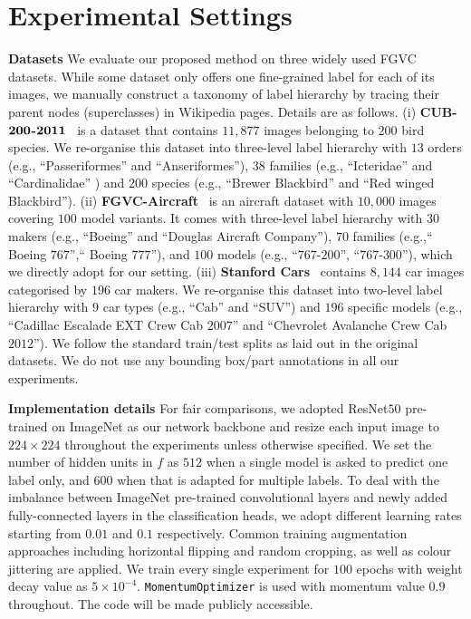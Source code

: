 \documentclass[final]{cvpr}
\newcommand{\keypoint}[1]{\vspace{0.05cm}\noindent\textbf{#1}\quad}
\begin{document}
\begin{table*}[htbp]
\end{table*}


\section{Experimental Settings}

\keypoint{Datasets} We evaluate our proposed method on three widely used FGVC datasets. While some dataset only offers one fine-grained label for each of its images, we manually construct a taxonomy of label hierarchy by tracing their parent nodes (superclasses) in Wikipedia pages. Details are as follows. (i) \textbf{CUB-$\bf{200}$-$\bf{2011}$}~\cite{wah2011caltech} is a dataset that contains $11,877$ images belonging to $200$ bird species. We re-organise this dataset into three-level label hierarchy with $13$ orders (e.g., ``Passeriformes'' and ``Anseriformes''), $38$ families (e.g.,  ``Icteridae'' and ``Cardinalidae'' ) and $200$ species (e.g., ``Brewer Blackbird''  and ``Red winged Blackbird''). (ii) \textbf{FGVC-Aircraft}~\cite{maji13fine} is an aircraft dataset with $10,000$ images covering $100$ model variants. It comes with three-level label hierarchy with $30$ makers (e.g., ``Boeing'' and ``Douglas Aircraft Company''), $70$ families (e.g.,`` Boeing $767$'',`` Boeing $777$''), and $100$ models (e.g., ``$767$-$200$'', ``$767$-$300$''), which we directly adopt for our setting. (iii) \textbf{Stanford Cars}~\cite{krause20133d} contains $8,144$ car images categorised by $196$ car makers.  We re-organise this dataset into two-level label hierarchy with $9$ car types (e.g., ``Cab'' and ``SUV'') and $196$ specific models (e.g., ``Cadillac Escalade EXT Crew Cab $2007$'' and ``Chevrolet Avalanche Crew Cab $2012$''). We follow the standard train/test splits as laid out in the original datasets. We do not use any bounding box/part annotations in all our experiments.

\keypoint{Implementation details} For fair comparisons, we adopted ResNet$50$ pre-trained on ImageNet as our network backbone and resize each input image to $224\times224$ throughout the experiments unless otherwise specified. We set the number of hidden units in $f$ as $512$ when a single model is asked to predict one label only, and $600$ when that is adapted for multiple labels. To deal with the imbalance between ImageNet pre-trained convolutional layers and newly added fully-connected layers in the classification heads, we adopt different learning rates starting from $0.01$ and $0.1$ respectively. Common training augmentation approaches including horizontal flipping and random cropping, as well as colour jittering are applied. We train every single experiment for $100$ epochs with weight decay value as $5\times10^{-4}$. \texttt{MomentumOptimizer} is used with momentum value $0.9$ throughout. The code will be made publicly accessible.
\end{document}
